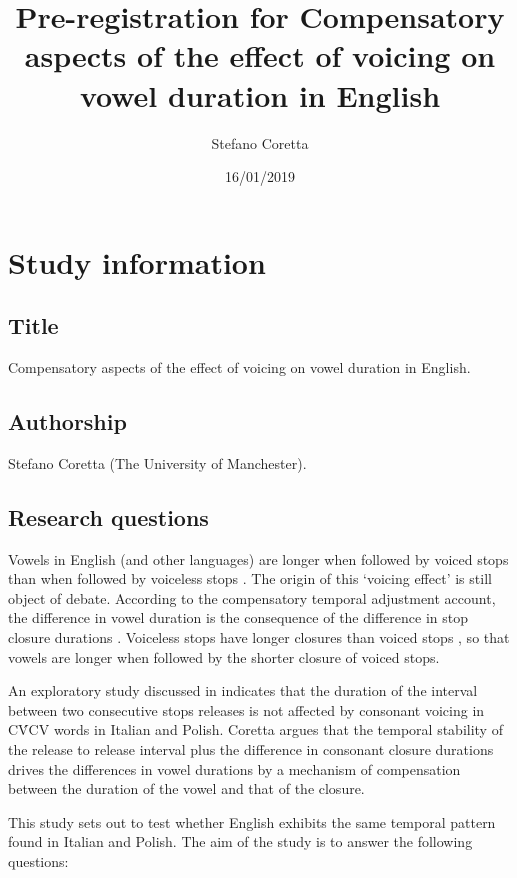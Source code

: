 \documentclass[11pt,]{article}
\title{Pre-registration for Compensatory aspects of the effect of voicing on
vowel duration in English}
\author{Stefano Coretta}
\date{16/01/2019}
\begin{document}
\maketitle

\section{Study information}\label{study-information}

\subsection{Title}\label{title}

Compensatory aspects of the effect of voicing on vowel duration in
English.

\subsection{Authorship}\label{authorship}

Stefano Coretta (The University of Manchester).

\subsection{Research questions}\label{research-questions}

Vowels in English (and other languages) are longer when followed by
voiced stops than when followed by voiceless stops \citep{heffner1937}.
The origin of this `voicing effect' is still object of debate. According
to the compensatory temporal adjustment account, the difference in vowel
duration is the consequence of the difference in stop closure durations
\citep{lindblom1967, slis1969a, slis1969, lehiste1970, lehiste1970a}.
Voiceless stops have longer closures than voiced stops
\citep{lisker1957, van-summers1987, davis1989, de-jong1991}, so that
vowels are longer when followed by the shorter closure of voiced stops.

An exploratory study discussed in \citet{coretta2018j} indicates that
the duration of the interval between two consecutive stops releases is
not affected by consonant voicing in CV́CV words in Italian and Polish.
Coretta argues that the temporal stability of the release to release
interval plus the difference in consonant closure durations drives the
differences in vowel durations by a mechanism of compensation between
the duration of the vowel and that of the closure.

This study sets out to test whether English exhibits the same temporal
pattern found in Italian and Polish. The aim of the study is to answer
the following questions:
\end{document}
